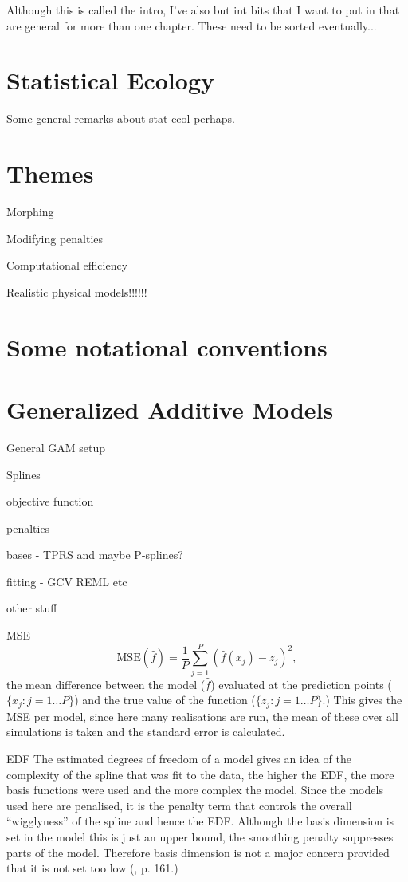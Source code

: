 Although this is called the intro, I've also but int bits that I want to put in that are general for more than one chapter. These need to be sorted eventually...

\section{Statistical Ecology}

Some general remarks about stat ecol perhaps.

\section{Themes}

\bi
	\item Morphing
	\item Modifying penalties
	\item Computational efficiency
	\item Realistic physical models!!!!!!
\ei


\section{Some notational conventions}



\section{Generalized Additive Models}

General GAM setup

\bi
\item Splines
\item objective function
\label{GAMobjfcn}
\item penalties
\label{GAMpenalties}
\item bases - TPRS and maybe P-splines?
\item fitting - GCV REML etc
\item other stuff
	\bi
	\item MSE
	\begin{equation}
\text{MSE}(\hat{f}) = \frac{1}{P} \sum_{j=1}^P (\hat{f}(x_j) - z_j)^2,
\end{equation}
the mean difference between the model ($\hat{f}$) evaluated at the prediction points ($\{x_j : j=1 \dots P\}$) and the true value of the function ($\{z_j : j=1 \dots P\}$.) This gives the MSE per model, since here many realisations are run, the mean of these over all simulations is taken and the standard error is calculated.
	\item EDF
	The estimated degrees of freedom of a model gives an idea of the complexity of the spline that was fit to the data, the higher the EDF, the more basis functions were used and  the more complex the model.  Since the models used here are penalised, it is the penalty term that controls the overall ``wigglyness'' of the spline and hence the EDF. Although the basis dimension is set in the model this is just an upper bound, the smoothing penalty suppresses parts of the model. Therefore basis dimension is not a major concern provided that it is not set too low (\cite{simonbook}, p. 161.) 

